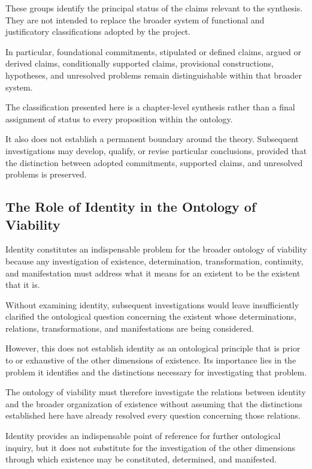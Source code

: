 These groups identify the principal status of
the claims relevant to the synthesis. They are
not intended to replace the broader system of
functional and justificatory classifications
adopted by the project.

In particular, foundational commitments,
stipulated or defined claims, argued or derived
claims, conditionally supported claims,
provisional constructions, hypotheses, and
unresolved problems remain distinguishable
within that broader system.

The classification presented here is a
chapter-level synthesis rather than a final
assignment of status to every proposition
within the ontology.

It also does not establish a permanent boundary
around the theory. Subsequent investigations
may develop, qualify, or revise particular
conclusions, provided that the distinction
between adopted commitments, supported claims,
and unresolved problems is preserved.

\subsection{The Role of Identity in the Ontology of Viability}

Identity constitutes an indispensable problem
for the broader ontology of viability because
any investigation of existence, determination,
transformation, continuity, and manifestation
must address what it means for an existent to
be the existent that it is.

Without examining identity, subsequent
investigations would leave insufficiently
clarified the ontological question concerning
the existent whose determinations, relations,
transformations, and manifestations are being
considered.

However, this does not establish identity as
an ontological principle that is prior to or
exhaustive of the other dimensions of existence.
Its importance lies in the problem it identifies
and the distinctions necessary for investigating
that problem.

The ontology of viability must therefore
investigate the relations between identity and
the broader organization of existence without
assuming that the distinctions established
here have already resolved every question
concerning those relations.

Identity provides an indispensable point of
reference for further ontological inquiry,
but it does not substitute for the investigation
of the other dimensions through which existence
may be constituted, determined, and manifested.

